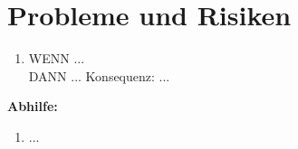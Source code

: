 \section{Probleme und Risiken}
\begin{enumerate}
	\item WENN ...\\
			DANN ... Konsequenz: ...

\end{enumerate}

\textbf{Abhilfe:}
\begin{enumerate}
	\item ...

\end{enumerate}
